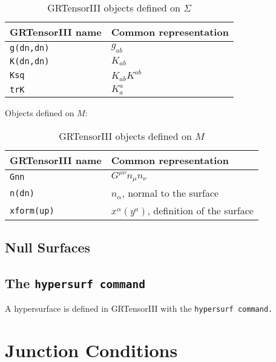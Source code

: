 \documentclass{article}
\begin{document}
\begin{table}
  \begin{center}
    \begin{tabular}{ll}\hline\hline
      \textbf{GRTensorIII name} & \textbf{Common representation}\\ \hline
      \texttt{g(dn,dn)}        & $g_{ab} $  \\
      \texttt{K(dn,dn)}        & $K_{ab} $  \\      
      \texttt{Ksq}        & $K_{ab} K^{ab}$  \\
      \texttt{trK}        & $K_{a}^{a} $  \\
    \end{tabular}
    \caption{GRTensorIII objects defined on $\Sigma$}
    \label{tbl:indices}
  \end{center}
\end{table}

Objects defined on $M$:
\begin{table}
  \begin{center}
    \begin{tabular}{ll}\hline\hline
      \textbf{GRTensorIII name} & \textbf{Common representation}\\ \hline
      \texttt{Gnn}        & $G^{\mu \nu} n_\mu n_\nu $  \\
      \texttt{n(dn) }      & $n_\alpha$, normal to the surface   \\    
      \texttt{xform(up)}        & $x^\alpha(y^a)$, definition of the surface  \\    
    \end{tabular}
    \caption{GRTensorIII objects defined on $M$}
    \label{tbl:indices}
  \end{center}
\end{table}

\subsection{Null Surfaces}

\subsection{The \text\tt{hypersurf} command}

A hypersurface is defined in GRTensorIII with the \text\tt{hypersurf} command. 

\section{Junction Conditions}


\vfill


\end{document}

